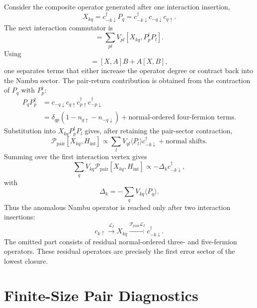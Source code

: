 \documentclass[aps,prb,reprint,superscriptaddress,nofootinbib]{revtex4-2}
\newcommand{\Liouv}{\mathcal{L}}
\newcommand{\Pc}{\mathcal{P}}
\begin{document}
Consider the composite operator generated after one interaction insertion,
\begin{equation}
X_{kq}=c_{-k\downarrow}^\dagger P_q
=c_{-k\downarrow}^\dagger c_{-q\downarrow}c_{q\uparrow}.
\end{equation}
The next interaction commutator is
\begin{equation}
[X_{kq},H_{\mathrm{int}}]
=\sum_{pl}V_{pl}[X_{kq},P_p^\dagger P_l].
\end{equation}
Using
\begin{equation}
[X,AB]=[X,A]B+A[X,B],
\end{equation}
one separates terms that either increase the operator degree or contract back into the Nambu sector. The pair-return contribution is obtained from the contraction of \(P_q\) with \(P_p^\dagger\):
\begin{align}
P_qP_p^\dagger
&=c_{-q\downarrow}c_{q\uparrow}
c_{p\uparrow}^\dagger c_{-p\downarrow}^\dagger\nonumber\\
&=\delta_{qp}(1-n_{q\uparrow}-n_{-q\downarrow})
+\text{normal-ordered four-fermion terms}.
\end{align}
Substitution into \(X_{kq}P_p^\dagger P_l\) gives, after retaining the pair-sector contraction,
\begin{equation}
\Pc_{\mathrm{pair}}[X_{kq},H_{\mathrm{int}}]
\propto
\sum_lV_{ql}
\langle P_l\rangle c_{-k\downarrow}^\dagger
+\text{normal shifts}.
\end{equation}
Summing over the first interaction vertex gives
\begin{equation}
\sum_qV_{kq}\Pc_{\mathrm{pair}}[X_{kq},H_{\mathrm{int}}]
\propto
-\Delta_k c_{-k\downarrow}^\dagger,
\end{equation}
with
\begin{equation}
\Delta_k=-\sum_qV_{kq}\langle P_q\rangle.
\end{equation}
Thus the anomalous Nambu operator is reached only after two interaction insertions:
\begin{equation}
c_{k\uparrow}
\xrightarrow{\Liouv_I}
X_{kq}
\xrightarrow{\Pc_{\mathrm{pair}}\Liouv_I}
c_{-k\downarrow}^\dagger .
\end{equation}
The omitted part consists of residual normal-ordered three- and five-fermion operators. These residual operators are precisely the first error sector of the lowest closure.

\section{Finite-Size Pair Diagnostics}
\end{document}
